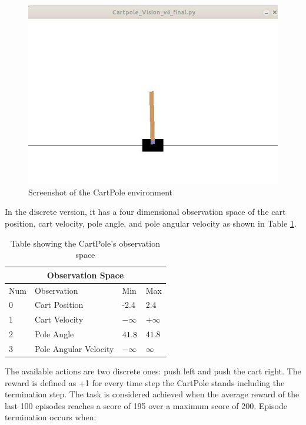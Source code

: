 \begin{figure}[h!]
	\centering
	\includegraphics[width=12cm]{images/Cartpole_screenshot.jpg}
	\caption{Screenshot of the CartPole environment}
	\label{fig:CartPoleScreenshot}
\end{figure}

In the discrete version, it has a four dimensional observation space of the cart position, cart velocity, pole angle, and pole angular velocity as shown in Table \ref{table:tableenvironment}.

\begin{table}[h!]
	\centering
	\begin{tabular}{ |p{2cm}|p{4cm}|p{2cm}|p{2cm}|  }
		\hline
		\multicolumn{4}{|c|}{Observation Space} \\
		\hline
		Num & Observation & Min & Max \\
		\hline
		0 & Cart Position & -2.4 & 2.4 \\
		1 & Cart Velocity & $-\infty$ & $+\infty$ \\
		2 & Pole Angle & $\-41.8$\textdegree & $41.8$\textdegree \\
		3 & Pole Angular Velocity & $-\infty$ & $\infty$ \\
		\hline
	\end{tabular}
	\label{table:tableenvironment}
	\caption{Table showing the CartPole's observation space}
\end{table}

 The available actions are two discrete ones: push left and push the cart right. The reward is defined as +1 for every time step the CartPole stands including the termination step. The task is considered achieved when the average reward of the last 100 episodes reaches a score of 195 over a maximum score of 200. Episode termination occurs when:

